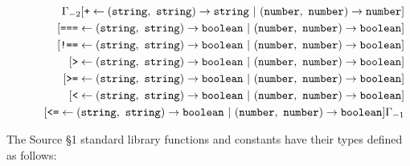 \begin{eqnarray*}
 & &
      \Gamma_{-2}
                 [ \texttt{+} \leftarrow (\texttt{string},\ \texttt{string}) \rightarrow \texttt{string}\ |\ (\texttt{number},\ \texttt{number}) \rightarrow \texttt{number}] \\
&& \hspace{6mm}  [ \texttt{===} \leftarrow (\texttt{string},\ \texttt{string}) \rightarrow \texttt{boolean}\ |\ (\texttt{number},\ \texttt{number}) \rightarrow \texttt{boolean}] \\
&& \hspace{6mm}  [ \texttt{!==} \leftarrow (\texttt{string},\ \texttt{string}) \rightarrow \texttt{boolean}\ |\ (\texttt{number},\ \texttt{number}) \rightarrow \texttt{boolean}] \\
&& \hspace{6mm}  [ \texttt{>} \leftarrow (\texttt{string},\ \texttt{string}) \rightarrow \texttt{boolean}\ |\ (\texttt{number},\ \texttt{number}) \rightarrow \texttt{boolean}]\\
&& \hspace{6mm}  [ \texttt{>=} \leftarrow (\texttt{string},\ \texttt{string}) \rightarrow \texttt{boolean}\ |\ (\texttt{number},\ \texttt{number}) \rightarrow \texttt{boolean}]\\
&& \hspace{6mm}  [ \texttt{<} \leftarrow (\texttt{string},\ \texttt{string}) \rightarrow \texttt{boolean}\ |\ (\texttt{number},\ \texttt{number}) \rightarrow \texttt{boolean}] \\
&& \hspace{6mm}  [ \texttt{<=} \leftarrow (\texttt{string},\ \texttt{string}) \rightarrow \texttt{boolean}\ |\ (\texttt{number},\ \texttt{number}) \rightarrow \texttt{boolean}]\Gamma_{-1}
\end{eqnarray*}

The Source \S 1 standard library functions and constants have their types defined as follows:

